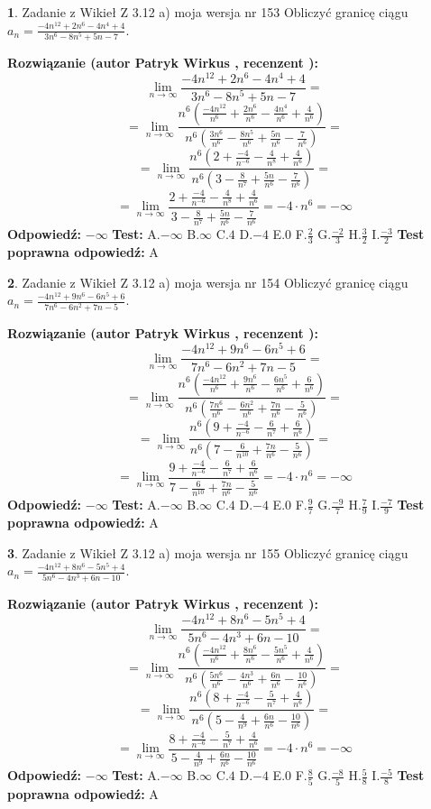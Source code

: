 \documentclass[12pt, a4paper]{article}
\theoremstyle{definition} %
\newtheorem{zad}{}
\newcommand{\zadStart}[1]{\begin{zad}#1\newline}
\newcommand{\zadStop}{\end{zad}}
\newcommand{\rozwStart}[2]{\noindent \textbf{Rozwiązanie (autor #1 , recenzent #2): }\newline}
\newcommand{\rozwStop}{\newline}
\newcommand{\odpStart}{\noindent \textbf{Odpowiedź:}\newline}
\newcommand{\odpStop}{\newline}
\newcommand{\testStart}{\noindent \textbf{Test:}\newline}
\newcommand{\testStop}{\newline}
\newcommand{\kluczStart}{\noindent \textbf{Test poprawna odpowiedź:}\newline}
\newcommand{\kluczStop}{\newline}
\begin{document}
\zadStart{Zadanie z Wikieł Z 3.12 a) moja wersja nr 153}
Obliczyć granicę ciągu $a_{n}=\frac{-4n^{12}+2n^{6}-4n^{4}+4}{3n^{6}-8n^{5}+5n-7}$.
\zadStop
\rozwStart{Patryk Wirkus}{}
$$\lim\limits_{n\to\infty}\frac{-4n^{12}+2n^{6}-4n^{4}+4}{3n^{6}-8n^{5}+5n-7}=$$
$$=\lim\limits_{n\to\infty}\frac{n^{6}\left(\frac{-4n^{12}}{n^{6}}+\frac{2n^{6}}{n^{6}}-\frac{4n^{4}}{n^{6}}+\frac{4}{n^{6}}\right)}{n^{6}\left(\frac{3n^{6}}{n^{6}}-\frac{8n^{5}}{n^{6}}+\frac{5n}{n^{6}}-\frac{7}{n^{6}}\right)}=$$
$$=\lim\limits_{n\to\infty}\frac{n^{6}\left(2+\frac{-4}{n^{-6}}-\frac{4}{n^{8}}+\frac{4}{n^{6}}\right)}
{n^{6}\left(3-\frac{8}{n^{7}}+\frac{5n}{n^{6}}-\frac{7}{n^{6}}\right)}=$$
$$=\lim\limits_{n\to\infty}\frac{2+\frac{-4}{n^{-6}}-\frac{4}{n^{8}}+\frac{4}{n^{6}}}{3-\frac{8}{n^{7}}+\frac{5n}{n^{6}}-\frac{7}{n^{6}}}=-4\cdot n^{6} = -\infty$$
\rozwStop
\odpStart
$-\infty$
\odpStop
\testStart
A.$-\infty$
B.$\infty$
C.$4$
D.$-4$
E.$0$
F.$\frac{2}{3}$
G.$\frac{-2}{3}$
H.$\frac{3}{2}$
I.$\frac{-3}{2}$
\testStop
\kluczStart
A
\kluczStop



\zadStart{Zadanie z Wikieł Z 3.12 a) moja wersja nr 154}
Obliczyć granicę ciągu $a_{n}=\frac{-4n^{12}+9n^{6}-6n^{5}+6}{7n^{6}-6n^{2}+7n-5}$.
\zadStop
\rozwStart{Patryk Wirkus}{}
$$\lim\limits_{n\to\infty}\frac{-4n^{12}+9n^{6}-6n^{5}+6}{7n^{6}-6n^{2}+7n-5}=$$
$$=\lim\limits_{n\to\infty}\frac{n^{6}\left(\frac{-4n^{12}}{n^{6}}+\frac{9n^{6}}{n^{6}}-\frac{6n^{5}}{n^{6}}+\frac{6}{n^{6}}\right)}{n^{6}\left(\frac{7n^{6}}{n^{6}}-\frac{6n^{2}}{n^{6}}+\frac{7n}{n^{6}}-\frac{5}{n^{6}}\right)}=$$
$$=\lim\limits_{n\to\infty}\frac{n^{6}\left(9+\frac{-4}{n^{-6}}-\frac{6}{n^{7}}+\frac{6}{n^{6}}\right)}
{n^{6}\left(7-\frac{6}{n^{10}}+\frac{7n}{n^{6}}-\frac{5}{n^{6}}\right)}=$$
$$=\lim\limits_{n\to\infty}\frac{9+\frac{-4}{n^{-6}}-\frac{6}{n^{7}}+\frac{6}{n^{6}}}{7-\frac{6}{n^{10}}+\frac{7n}{n^{6}}-\frac{5}{n^{6}}}=-4\cdot n^{6} = -\infty$$
\rozwStop
\odpStart
$-\infty$
\odpStop
\testStart
A.$-\infty$
B.$\infty$
C.$4$
D.$-4$
E.$0$
F.$\frac{9}{7}$
G.$\frac{-9}{7}$
H.$\frac{7}{9}$
I.$\frac{-7}{9}$
\testStop
\kluczStart
A
\kluczStop



\zadStart{Zadanie z Wikieł Z 3.12 a) moja wersja nr 155}
Obliczyć granicę ciągu $a_{n}=\frac{-4n^{12}+8n^{6}-5n^{5}+4}{5n^{6}-4n^{3}+6n-10}$.
\zadStop
\rozwStart{Patryk Wirkus}{}
$$\lim\limits_{n\to\infty}\frac{-4n^{12}+8n^{6}-5n^{5}+4}{5n^{6}-4n^{3}+6n-10}=$$
$$=\lim\limits_{n\to\infty}\frac{n^{6}\left(\frac{-4n^{12}}{n^{6}}+\frac{8n^{6}}{n^{6}}-\frac{5n^{5}}{n^{6}}+\frac{4}{n^{6}}\right)}{n^{6}\left(\frac{5n^{6}}{n^{6}}-\frac{4n^{3}}{n^{6}}+\frac{6n}{n^{6}}-\frac{10}{n^{6}}\right)}=$$
$$=\lim\limits_{n\to\infty}\frac{n^{6}\left(8+\frac{-4}{n^{-6}}-\frac{5}{n^{7}}+\frac{4}{n^{6}}\right)}
{n^{6}\left(5-\frac{4}{n^{9}}+\frac{6n}{n^{6}}-\frac{10}{n^{6}}\right)}=$$
$$=\lim\limits_{n\to\infty}\frac{8+\frac{-4}{n^{-6}}-\frac{5}{n^{7}}+\frac{4}{n^{6}}}{5-\frac{4}{n^{9}}+\frac{6n}{n^{6}}-\frac{10}{n^{6}}}=-4\cdot n^{6} = -\infty$$
\rozwStop
\odpStart
$-\infty$
\odpStop
\testStart
A.$-\infty$
B.$\infty$
C.$4$
D.$-4$
E.$0$
F.$\frac{8}{5}$
G.$\frac{-8}{5}$
H.$\frac{5}{8}$
I.$\frac{-5}{8}$
\testStop
\kluczStart
A
\kluczStop
\end{document}
